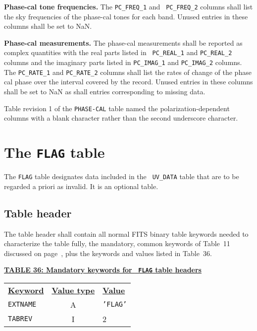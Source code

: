 \documentclass[twoside]{article}
\newcommand{\Hi}[1]{\textcolor{hicol}{#1}}
\begin{document}
{\bf Phase-cal tone frequencies.} The {\tt PC\_FREQ\_1} and {\tt
  PC\_FREQ\_2} columns shall list the sky frequencies of the phase-cal
tones for each band.  Unused entries in these columns shall be set to
NaN.

{\bf Phase-cal measurements.}  The phase-cal measurements shall be
reported as complex quantities with the real parts listed in {\tt
  PC\_REAL\_1} and {\tt PC\_REAL\_2} \Hi{columns} and the imaginary
parts listed in {\tt PC\_IMAG\_1} and {\tt PC\_IMAG\_2} \Hi{columns}.
The {\tt PC\_RATE\_1} and {\tt PC\_RATE\_2} \Hi{columns} shall list
the rates of change of the phase cal phase over the interval covered
by the record.  Unused entries in these columns shall be set to NaN as
shall entries corresponding to missing data.

\Hi{Table revision 1 of the {\tt PHASE-CAL} table named the
polarization-dependent columns with a blank character rather than the
second underscore character.}

\section{The {\tt FLAG} table}
\label{s:FG}

The {\tt FLAG} table designates data \Hi{included in the {\tt
UV\_DATA}} table that are to be regarded \Hi{a priori} as
invalid.  It is an optional table.

\subsection{Table header}

\Hi{The table header shall contain all normal FITS binary table
keywords needed to characterize the table fully, the mandatory, common
keywords of Table~11 discussed on page~\pageref{ta:keywords}, plus the
keywords and values listed in Table~\Hi{36}.}

\begin{center}
\underline{\bf{TABLE \Hi{36}: Mandatory keywords for {\tt
    FLAG} table headers}}\\
\begin{tabular}{lcl}
\noalign{\vspace{2pt}}
\underline{{\bf Keyword}} & \underline{\bf{Value type}} &
    \underline{\bf{Value\vphantom{y}}} \\
\noalign{\vspace{2pt}}
{\tt EXTNAME}   & A & {\tt 'FLAG'}  \\
{\tt TABREV}    & I & 2
\end{tabular}
\end{center}
\end{document}

